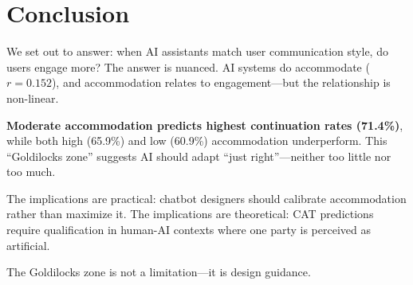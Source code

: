 \section{Conclusion}

We set out to answer: when AI assistants match user communication style, do users engage more? The answer is nuanced. AI systems do accommodate ($r=0.152$), and accommodation relates to engagement---but the relationship is non-linear.

\textbf{Moderate accommodation predicts highest continuation rates (71.4\%)}, while both high (65.9\%) and low (60.9\%) accommodation underperform. This ``Goldilocks zone'' suggests AI should adapt ``just right''---neither too little nor too much.

The implications are practical: chatbot designers should calibrate accommodation rather than maximize it. The implications are theoretical: CAT predictions require qualification in human-AI contexts where one party is perceived as artificial.

The Goldilocks zone is not a limitation---it is design guidance.
